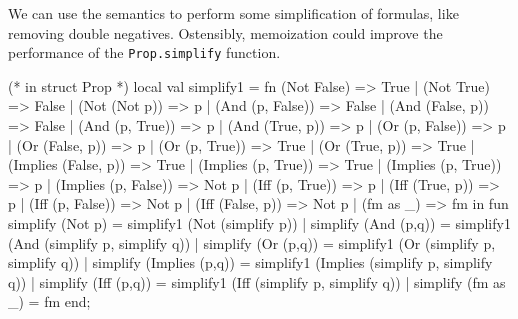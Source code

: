 \begin{node}[Simplification]\label{prop-000Z}%
We can use the semantics to perform some simplification of formulas,
like removing double negatives. Ostensibly, memoization could improve
the performance of the \lstinline[basicstyle=\color{sbase03}\ttfamily\small,language=SML]{Prop.simplify} function.
\begin{sml}
(* in struct Prop *)
local
  val simplify1 =
  fn (Not False) => True
   | (Not True) => False
   | (Not (Not p)) => p
   | (And (p, False)) => False
   | (And (False, p)) => False
   | (And (p, True)) => p
   | (And (True, p)) => p
   | (Or (p, False)) => p
   | (Or (False, p)) => p
   | (Or (p, True)) => True
   | (Or (True, p)) => True
   | (Implies (False, p)) => True
   | (Implies (p, True)) => True
   | (Implies (p, True)) => p
   | (Implies (p, False)) => Not p
   | (Iff (p, True)) => p
   | (Iff (True, p)) => p
   | (Iff (p, False)) => Not p
   | (Iff (False, p)) => Not p
   | (fm as _) => fm
in
  fun simplify (Not p) = simplify1 (Not (simplify p))
   |  simplify (And (p,q)) = simplify1 (And (simplify p, simplify q))
   |  simplify (Or (p,q)) = simplify1 (Or (simplify p, simplify q))
   |  simplify (Implies (p,q)) = simplify1 (Implies (simplify p, simplify q))
   |  simplify (Iff (p,q)) = simplify1 (Iff (simplify p, simplify q))
   |  simplify (fm as _) = fm
end;
\end{sml}
\end{node}

